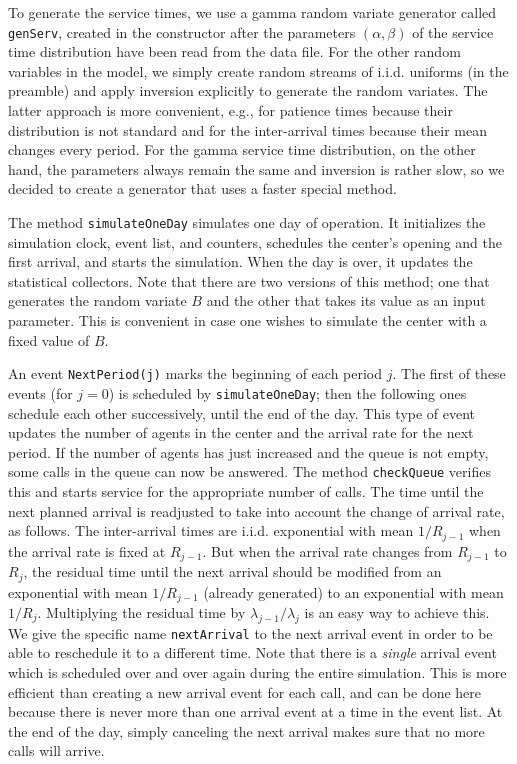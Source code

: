 To generate the service times, we use a gamma random variate
generator called \texttt{genServ}, created in the constructor
after the parameters $(\alpha,\beta)$ of the service time distribution
have been read from the data file.
For the other random variables in the model, we simply create random
streams of i.i.d.{} uniforms (in the preamble) and apply inversion
explicitly to generate the random variates.
The latter approach is more convenient, e.g., for patience times
because their distribution is not standard and for the inter-arrival
times because their mean changes every period.
For the gamma service time distribution, on the other hand,
the parameters always remain the same and inversion is rather slow,
so we decided to create a generator that uses a faster special method.

The method \texttt{simulateOneDay} simulates one day of operation.
It initializes the simulation clock, event list, and counters,
schedules the center's opening
and the first arrival, and starts the simulation.
When the day is over, it updates the statistical collectors.
Note that there are two versions of this method; one that generates the random
variate $B$ and the other that takes its value as an input parameter.
This is convenient in case one wishes to simulate the center with
a fixed value of $B$.

An event \texttt{NextPeriod(j)} marks the beginning of each period $j$.
The first of these events (for $j=0$) is scheduled by \texttt{simulateOneDay};
then the following ones schedule each other successively,
until the end of the day.
This type of event updates the number of agents in the center and
the arrival rate for the next period.
If the number of agents has just increased and the queue is not empty,
some calls in the queue can now be answered.
The method \texttt{checkQueue} verifies this and starts service for the
appropriate number of calls.
The time until the next planned arrival is readjusted to take into account
the change of arrival rate, as follows.
The inter-arrival times are i.i.d.{} exponential with
mean $1/R_{j-1}$ when the arrival rate is fixed at $R_{j-1}$.
But when the arrival rate changes from $R_{j-1}$ to $R_j$,
the residual time until the next arrival should be modified from an
exponential with mean $1/R_{j-1}$ (already generated)
to an exponential with mean $1/R_j$.
Multiplying the residual time by $\lambda_{j-1}/\lambda_j$ is an easy
way to achieve this.
We give the specific name \texttt{nextArrival} to the next arrival
event in order to be able to reschedule it to a different time.
Note that there is a \emph{single} arrival event which is scheduled
over and over again during the entire simulation.
This is more efficient than creating a new arrival event for each
call, and can be done here because there is never more than one arrival
event at a time in the event list.
At the end of the day, simply canceling the next arrival makes sure
that no more calls will arrive.

